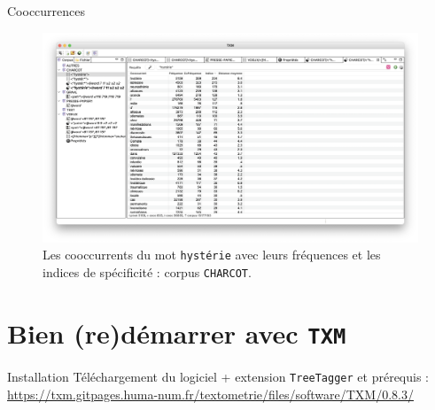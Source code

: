 \documentclass[xetex,xcolor={table,usenames,dvipsnames}]{beamer}
\begin{document}
\begin{frame}{Cooccurrences}
		\begin{figure}[h] %
		\centering
		\includegraphics[width=1\linewidth]{img/cooccurrences.png}
		\caption{Les cooccurrents du mot \texttt{hystérie} avec leurs fréquences et les indices de spécificité : corpus \texttt{CHARCOT}.}
		\label{fig:ling_out_TAL}
	\end{figure}
\end{frame}

\section{Bien (re)démarrer avec \texttt{TXM}}

\begin{frame}{Installation}
	Téléchargement du logiciel + extension \texttt{TreeTagger} et prérequis :\\ \url{https://txm.gitpages.huma-num.fr/textometrie/files/software/TXM/0.8.3/}
\end{frame}

\begin{frame}[allowframebreaks]
		\printbibliography
\end{frame}
\end{document}
